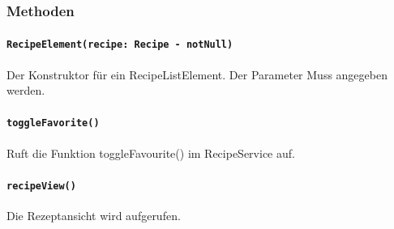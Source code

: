 \documentclass[parskip=full]{scrartcl}
\begin{document}
        \subsubsection*{Methoden}
            \paragraph*{\texttt{RecipeElement(recipe: Recipe - notNull)}} Der Konstruktor für ein RecipeListElement. Der Parameter Muss angegeben werden.
            \paragraph*{\texttt{toggleFavorite()}} Ruft die Funktion toggleFavourite() im RecipeService auf.
            \paragraph*{\texttt{recipeView()}} Die Rezeptansicht wird aufgerufen.
\end{document}
